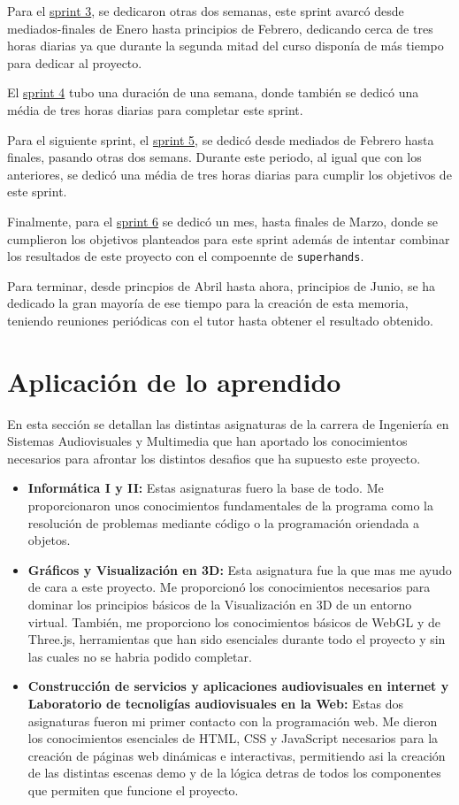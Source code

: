 \documentclass[a4paper, 12pt]{book}
\begin{document}
Para el \hyperref[sec:sprint3]{sprint 3}, se dedicaron otras dos semanas, este sprint avarcó desde mediados-finales de Enero hasta principios de Febrero, dedicando cerca de tres horas diarias ya que durante la segunda mitad del curso disponía de más tiempo para dedicar al proyecto.

El \hyperref[sec:sprint4]{sprint 4} tubo una duración de una semana, donde también se dedicó una média de tres horas diarias para completar este sprint.

Para el siguiente sprint, el \hyperref[sec:sprint5]{sprint 5}, se dedicó desde mediados de Febrero hasta finales, pasando otras dos semans. Durante este periodo, al igual que con los anteriores, se dedicó una média de tres horas diarias para cumplir los objetivos de este sprint. 

Finalmente, para el \hyperref[sec:sprint6]{sprint 6} se dedicó un mes, hasta finales de Marzo, donde se cumplieron los objetivos planteados para este sprint además de intentar combinar los resultados de este proyecto con el compoennte de \texttt{superhands}.

Para terminar, desde princpios de Abril hasta ahora, principios de Junio, se ha dedicado la gran mayoría de ese tiempo para la creación de esta memoria, teniendo reuniones periódicas con el tutor hasta obtener el resultado obtenido. 

\section{Aplicación de lo aprendido}
\label{sec:aplicacion}

En esta sección se detallan las distintas asignaturas de la carrera de Ingeniería en Sistemas Audiovisuales y Multimedia que han aportado los conocimientos necesarios para afrontar los distintos desafios que ha supuesto este proyecto. 

\begin{itemize}
  \item \textbf{Informática I y II:} Estas asignaturas fuero la base de todo. Me proporcionaron unos conocimientos fundamentales de la programa como la resolución de problemas mediante código o la programación oriendada a objetos.
  \item \textbf{Gráficos y Visualización en 3D:} Esta asignatura fue la que mas me ayudo de cara a este proyecto. Me proporcionó los conocimientos necesarios para dominar los principios básicos de la Visualización en 3D de un entorno virtual. También, me proporciono los conocimientos básicos de WebGL y de Three.js, herramientas que han sido esenciales durante todo el proyecto y sin las cuales no se habria podido completar. 
  \item \textbf{Construcción de servicios y aplicaciones audiovisuales en internet y Laboratorio de tecnoligías audiovisuales en la Web:} Estas dos asignaturas fueron mi primer contacto con la programación web. Me dieron los conocimientos esenciales de HTML, CSS y JavaScript necesarios para la creación de páginas web dinámicas e interactivas, permitiendo asi la creación de las distintas escenas demo y de la lógica detras de todos los componentes que permiten que funcione el proyecto.
\end{itemize}
\end{document}
